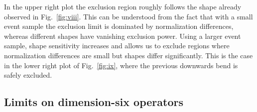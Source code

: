 \documentclass{JHEP3}
\begin{document}
In the upper right plot the exclusion region roughly follows the shape already observed in Fig.~\ref{fig:viii}. 
This can be understood from the fact that with a small event sample the exclusion limit is dominated by 
normalization differences, whereas different shapes have vanishing exclusion power. 
Using a larger event sample, shape sensitivity increases and allows us to exclude regions where normalization differences 
are small but shapes differ significantly.
This is the case in the lower right plot of Fig.~\ref{fig:ix}, where the previous downwards bend is safely excluded.








\subsection{Limits on dimension-six operators}
\label{DimSixLimits}
\end{document}
